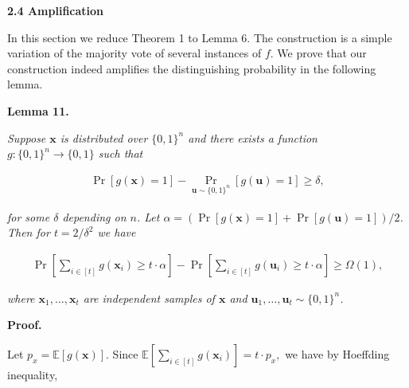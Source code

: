 \par\medskip\noindent\textbf{
2.4 Amplification}\par




In this section we reduce Theorem 1 to Lemma 6. The construction is a simple variation of the majority vote of several instances of $f$. We prove that our construction indeed amplifies the distinguishing probability in the following lemma.\par





\par\medskip\noindent\textbf{
\textbf{Lemma 11}\textbf{.}
}\par



\emph{Suppose $\bm{x}$ is distributed over $\{0,1\}^{n}$ and there exists a function $g\colon\{0,1\}^{n}\to\{0,1\}$ such that}\par


\[\begin{gathered}
\Pr[g(\bm{x})=1]-\Pr_{\bm{u}\sim\{0,1\}^{n}}[g(\bm{u})=1]\geq\delta,
\end{gathered}\]


\emph{for some $\delta$ depending on $n$.
Let $\alpha=(\Pr[g(\bm{x})=1]+\Pr[g(\bm{u})=1])/2$.
Then for $t=2/\delta^{2}$ we have}\par


\[\begin{gathered}
\Pr\left[\sum_{i\in[t]}g(\bm{x}_{i})\geq t\cdot\alpha\right]-\Pr\left[\sum_{i\in[t]}g(\bm{u}_{i})\geq t\cdot\alpha\right]\geq\Omega(1),
\end{gathered}\]


\emph{where $\bm{x}_{1},\dots,\bm{x}_{t}$ are independent samples of $\bm{x}$ and $\bm{u}_{1},\dots,\bm{u}_{t}\sim\{0,1\}^{n}$.}\par






\par\medskip\noindent\textbf{Proof.}\par




Let $p_{x}=\mathbb{E}[g(\bm{x})]$.
Since
$\mathbb{E}\left[\sum_{i\in[t]}g(\bm{x}_{i})\right]=t\cdot p_{x},$
we have by Hoeffding inequality,\par


